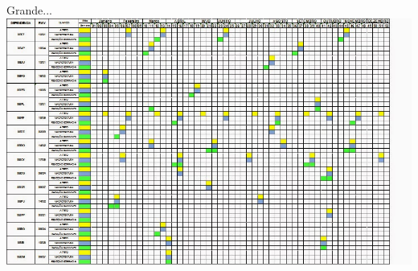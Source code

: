 \documentclass{beamer}
\begin{document}
\begin{frame}{Grande...}
  \includegraphics[width=\textwidth]{Planejamento/cronograma-3}
\end{frame}





\end{document}
